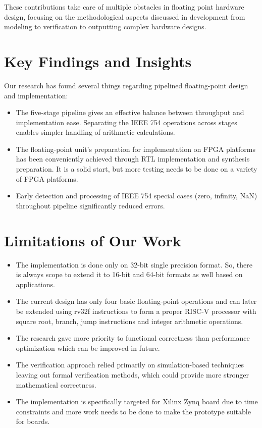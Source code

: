 These contributions take care of multiple obstacles in floating point hardware design, focusing on the methodological aspects discussed in development from modeling to verification to outputting complex hardware designs.

\section{Key Findings and Insights}
\label{sec:key_findings}

Our research has found several things regarding pipelined floating-point design and implementation:

\begin{itemize}
    \item The five-stage pipeline gives an effective balance between throughput and implementation ease. Separating the IEEE 754 operations across stages enables simpler handling of arithmetic calculations.
    
    \item The floating-point unit's preparation for implementation on FPGA platforms has been conveniently achieved through RTL implementation and synthesis preparation. It is a solid start, but more testing needs to be done on a variety of FPGA platforms.
    
    \item Early detection and processing of IEEE 754 special cases (zero, infinity, NaN) throughout pipeline significantly reduced errors.
\end{itemize}

\section{Limitations of Our Work}
\label{sec:limitations}

\begin{itemize}
    \item The implementation is done only on 32-bit single precision format. So, there is always scope to extend it to 16-bit and 64-bit formats as well based on applications.
    
    \item The current design has only four basic floating-point operations and can later be extended using rv32f instructions to form a proper RISC-V processor with square root, branch, jump instructions and integer arithmetic operations.
    
    \item The research gave more priority to functional correctness than performance optimization which can be improved in future.
    
    \item The verification approach relied primarily on simulation-based techniques leaving out formal verification methods, which could provide more stronger mathematical correctness.
    
    \item The implementation is specifically targeted for Xilinx Zynq board due to time constraints and more work needs to be done to make the prototype suitable for boards.
\end{itemize}

